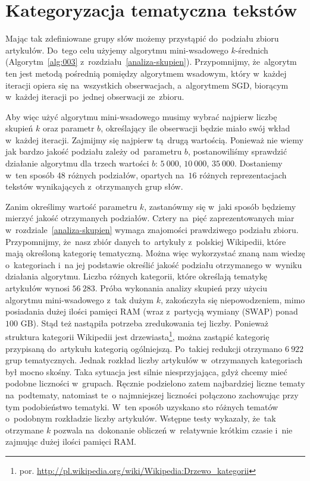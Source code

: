 \documentclass{praca1}
\begin{document}
\section{Kategoryzacja tematyczna tekstów}

Mając tak zdefiniowane grupy słów możemy przystąpić do~podziału zbioru artykułów. Do~tego celu użyjemy algorytmu mini-wsadowego $k$-średnich (Algorytm~\ref{alg:003} z~rozdziału~\ref{analiza-skupien}). Przypomnijmy, że~algorytm ten jest metodą pośrednią pomiędzy algorytmem wsadowym, który w~każdej iteracji opiera się na~wszystkich obserwacjach, a~algorytmem SGD, biorącym w~każdej iteracji po~jednej obserwacji ze~zbioru. 

Aby więc użyć algorytmu mini-wsadowego musimy wybrać najpierw liczbę skupień $k$ oraz parametr $b$, określający ile obserwacji będzie miało swój wkład w~każdej iteracji. Zajmijmy się najpierw tą~drugą wartością. Ponieważ nie wiemy jak bardzo jakość podziału zależy od~parametru $b$, postanowiliśmy sprawdzić działanie algorytmu dla trzech wartości $b$: $5\ 000$, $10\ 000$, $35\ 000$. Dostaniemy w~ten sposób 48 różnych podziałów, opartych na~$16$ różnych reprezentacjach tekstów wynikających z~otrzymanych grup słów.

Zanim określimy wartość parametru $k$, zastanówmy się w~jaki sposób będziemy mierzyć jakość otrzymanych podziałów. Cztery na~pięć zaprezentowanych miar w~rozdziale~\ref{analiza-skupien} wymaga znajomości prawdziwego podziału zbioru. Przypomnijmy, że~nasz zbiór danych to~artykuły z~polskiej Wikipedii, które mają określoną kategorię tematyczną. Można więc wykorzystać znaną nam wiedzę o~kategoriach i~na jej podstawie określić jakość podziału otrzymanego w~wyniku działania algorytmu. Liczba różnych kategorii, które określają tematykę artykułów wynosi $56\ 283$. Próba wykonania analizy skupień przy użyciu algorytmu mini-wsadowego z~tak dużym $k$, zakończyła się niepowodzeniem, mimo posiadania dużej ilości pamięci RAM (wraz z~partycją wymiany (SWAP) ponad $100$ GB). Stąd też nastąpiła potrzeba zredukowania tej liczby. Ponieważ struktura kategorii Wikipedii jest drzewiasta\footnote{por. \url{http://pl.wikipedia.org/wiki/Wikipedia:Drzewo_kategorii}}, można zastąpić kategorię przypisaną do~artykułu kategorią ogólniejszą. Po~takiej redukcji otrzymano $6\ 922$ grup tematycznych. Jednak rozkład liczby artykułów w~otrzymanych kategoriach był mocno skośny. Taka sytuacja jest silnie niesprzyjająca, gdyż chcemy mieć podobne liczności w~grupach. Ręcznie podzielono zatem najbardziej liczne tematy na~podtematy, natomiast te~o najmniejszej liczności połączono zachowując przy tym podobieństwo tematyki. W~ten sposób uzyskano sto różnych tematów o~podobnym rozkładzie liczby artykułów. Wstępne testy wykazały, że~tak otrzymane $k$ pozwala na~dokonanie obliczeń w~relatywnie krótkim czasie i~nie zajmując dużej ilości pamięci RAM.
\end{document}
